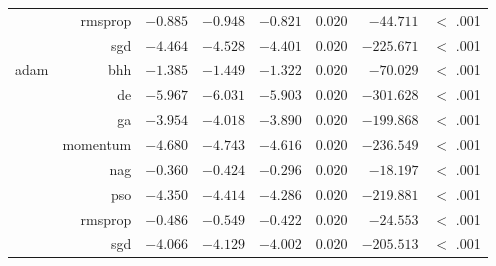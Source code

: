 \begin{table}[htbp]
{\begin{tabular}{lrrrrrrr}
                                       & rmsprop              & $-0.885$             & $-0.948$                                        & $-0.821$             & $0.020$              & $-44.711$            & $<$ .001    \\
                                       & sgd                  & $-4.464$             & $-4.528$                                        & $-4.401$             & $0.020$              & $-225.671$           & $<$ .001    \\
                  adam                 & bhh                  & $-1.385$             & $-1.449$                                        & $-1.322$             & $0.020$              & $-70.029$            & $<$ .001    \\
                  $ $                  & de                   & $-5.967$             & $-6.031$                                        & $-5.903$             & $0.020$              & $-301.628$           & $<$ .001    \\
                                       & ga                   & $-3.954$             & $-4.018$                                        & $-3.890$             & $0.020$              & $-199.868$           & $<$ .001    \\
                                       & momentum             & $-4.680$             & $-4.743$                                        & $-4.616$             & $0.020$              & $-236.549$           & $<$ .001    \\
                                       & nag                  & $-0.360$             & $-0.424$                                        & $-0.296$             & $0.020$              & $-18.197$            & $<$ .001    \\
                                       & pso                  & $-4.350$             & $-4.414$                                        & $-4.286$             & $0.020$              & $-219.881$           & $<$ .001    \\
                                       & rmsprop              & $-0.486$             & $-0.549$                                        & $-0.422$             & $0.020$              & $-24.553$            & $<$ .001    \\
                                       & sgd                  & $-4.066$             & $-4.129$                                        & $-4.002$             & $0.020$              & $-205.513$           & $<$ .001    \\

\end{tabular}}
\end{table}
